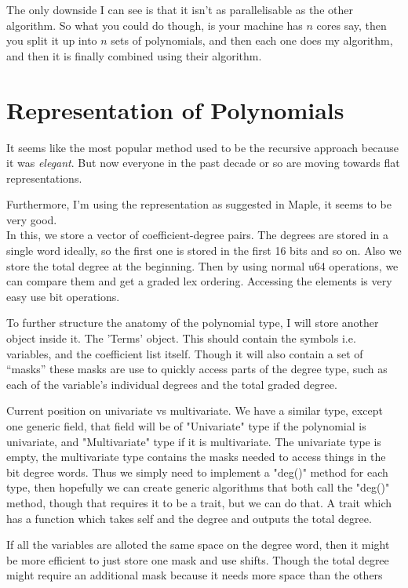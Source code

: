The only downside I can see is that it isn't as parallelisable as the other algorithm. So what you could do though, is your machine has $n$ cores say, then you split it up into $n$ sets of polynomials, and then each one does my algorithm, and then it is finally combined using their algorithm.

\section{Representation of Polynomials}

It seems like the most popular method used to be the recursive approach because it was \emph{elegant}. But now everyone in the past decade or so are moving towards flat representations.

Furthermore, I'm using the representation as suggested in Maple, it seems to be very good.\\
In this, we store a vector of coefficient-degree pairs. The degrees are stored in a single word ideally, so the first one is stored in the first 16 bits and so on. Also we store the total degree at the beginning. Then by using normal u64 operations, we can compare them and get a graded lex ordering. Accessing the elements is very easy use bit operations.

To further structure the anatomy of the polynomial type, I will store another object inside it. The 'Terms' object. This should contain the symbols i.e. variables, and the coefficient list itself. Though it will also contain a set of ``masks'' these masks are use to quickly access parts of the degree type, such as each of the variable's individual degrees and the total graded degree. 

 Current position on univariate vs multivariate. We have a similar type, except one generic field, that field will be of "Univariate" type if the polynomial is univariate, and "Multivariate" type if it is multivariate. The univariate type is empty, the multivariate type contains the masks needed to access things in the bit degree words. Thus we simply need to implement a "deg()" method for each type, then hopefully we can create generic algorithms that both call the "deg()" method, though that requires it to be a trait, but we can do that. A trait which has a function which takes self and the degree and outputs the total degree.

 If all the variables are alloted the same space on the degree word, then it might be more efficient to just store one mask and use shifts. Though the total degree might require an additional mask because it needs more space than the others

